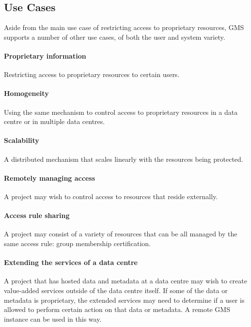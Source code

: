 \documentclass[11pt,a4paper]{ivoa}
\begin{document}
\subsection{Use Cases}
\label{subsec:usecases}

Aside from the main use case of restricting access to proprietary resources, GMS supports a number of other use cases, of both the user and system variety.

\paragraph{Proprietary information} Restricting access to proprietary resources to certain users.

\paragraph{Homogeneity} Using the same mechanism to control access to proprietary resources in a data centre or in multiple data centres.

\paragraph{Scalability} A distributed mechanism that scales linearly with the resources being protected.

\paragraph{Remotely managing access} A project may wish to control access to resources that reside externally.

\paragraph{Access rule sharing} A project may consist of a variety of resources that can be all managed by the same access rule: group membership certification.

\paragraph{Extending the services of a data centre} A project that has hosted data and metadata at a data centre may wish to create value-added services outside of the data centre itself.  If some of the data or metadata is proprietary, the extended services may need to determine if a user is allowed to perform certain action on that data or metadata.  A remote GMS instance can be used in this way.
\end{document}
